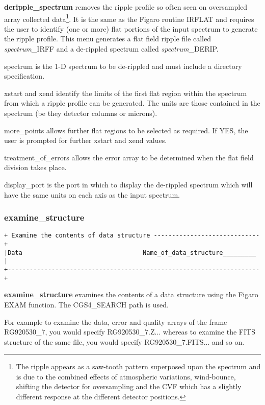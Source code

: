 {{\bf deripple\_spectrum} removes the ripple profile so often seen on
oversampled array collected data\footnote{The ripple appears as a saw-tooth 
pattern superposed upon the spectrum and is due to the combined 
effects of atmospheric variations, wind-bounce, shifting the detector for 
oversampling and the CVF which has a slightly different response at the 
different detector positions.}. It is the same as the Figaro routine 
{\sf IRFLAT} and requires the user to identify (one or more) flat portions 
of the input spectrum to 
generate the ripple profile. This menu generates a flat field ripple file 
called {\em spectrum}\_IRFF and a de-rippled spectrum called 
{\em spectrum}\_DERIP. 

{\sf spectrum} is the 1-D spectrum to be de-rippled and must include a
directory specification.

{\sf xstart} and {\sf xend} identify the limits of the first flat region
within the spectrum from which a ripple profile can be generated. The
units are those contained in the spectrum (be they detector columns or
microns). 

{\sf more\_points} allows further flat regions to be selected as required.
If {\sf YES}, the user is prompted for further {\sf xstart} and {\sf xend}
values.

{\sf treatment\_of\_errors} allows the error array to be determined when
the flat field division takes place.

{\sf display\_port} is the port in which to display the de-rippled spectrum
which will have the same units on each axis as the input spectrum.

\subsubsection{examine\_structure}
\begin{verbatim}
+ Examine the contents of data structure -----------------------------+
|Data                                 Name_of_data_structure_________ |
+---------------------------------------------------------------------+
\end{verbatim}

{\bf examine\_structure} examines the contents of a data structure
using the Figaro EXAM function. The CGS4\_SEARCH path is used.

For example to examine the data, error and quality arrays of the frame 
{\sf RG920530\_7}, you would specify {\sf RG920530\_7.Z...} whereas to 
examine the FITS structure of the same file, you would specify 
{\sf RG920530\_7.FITS...} and so on.

}
